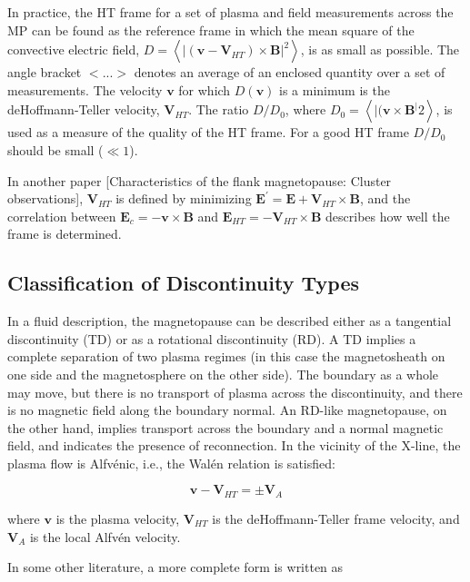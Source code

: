 \documentclass[
  notoc %
]{tufte-book}
\begin{document}
In practice, the HT frame for a set of plasma and field measurements
across the MP can be found as the reference frame in which the mean
square of the convective electric field,
\(D=\left<|(\mathbf{v}-\mathbf{V}_{HT})\times\mathbf{B}|^2\right>\), is
as small as possible. The angle bracket \(<...>\) denotes an average of
an enclosed quantity over a set of measurements. The velocity
\(\mathbf{v}\) for which \(D(\mathbf{v})\) is a minimum is the
deHoffmann-Teller velocity, \(\mathbf{V}_{HT}\). The ratio \(D/D_0\),
where \(D_0=\left<|(\mathbf{v}\times\mathbf{B}^|2\right>\), is used as a
measure of the quality of the HT frame. For a good HT frame \(D/D_0\)
should be small (\(\ll 1\)).

In another paper {[}Characteristics of the flank magnetopause: Cluster
observations{]}, \(\mathbf{V}_{HT}\) is defined by minimizing
\(\mathbf{E}^\prime = \mathbf{E} + \mathbf{V}_{HT}\times\mathbf{B}\),
and the correlation between \(\mathbf{E}_c=-\mathbf{v}\times\mathbf{B}\)
and \(\mathbf{E}_{HT}=-\mathbf{V}_{HT}\times\mathbf{B}\) describes how
well the frame is determined.

\hypertarget{classification-of-discontinuity-types}{%
\subsection{Classification of Discontinuity
Types}\label{classification-of-discontinuity-types}}

In a fluid description, the magnetopause can be described either as a
tangential discontinuity (TD) or as a rotational discontinuity (RD). A
TD implies a complete separation of two plasma regimes (in this case the
magnetosheath on one side and the magnetosphere on the other side). The
boundary as a whole may move, but there is no transport of plasma across
the discontinuity, and there is no magnetic field along the boundary
normal. An RD-like magnetopause, on the other hand, implies transport
across the boundary and a normal magnetic field, and indicates the
presence of reconnection. In the vicinity of the X-line, the plasma flow
is Alfvénic, i.e., the Walén relation is satisfied:

\[
\mathbf{v} - \mathbf{V}_{HT} = \pm\mathbf{V}_A
\]

where \(\mathbf{v}\) is the plasma velocity, \(\mathbf{V}_{HT}\) is the
deHoffmann-Teller frame velocity, and \(\mathbf{V}_A\) is the local
Alfvén velocity.

In some other literature, a more complete form is written as
\end{document}
